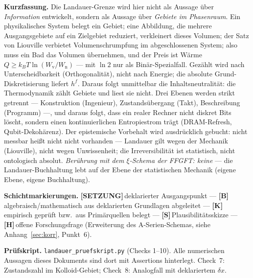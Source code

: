 \documentclass[11pt,a4paper]{article}
\newcommand{\LS}{\textcolor{laySet}{\textbf{\footnotesize\textsf{[SETZUNG]}}}\,}
\newcommand{\LK}{\textcolor{layK}{\textbf{\footnotesize\textsf{[K]}}}\,}
\newcommand{\LB}{\textcolor{layB}{\textbf{\footnotesize\textsf{[B]}}}\,}
\newcommand{\LSk}{\textcolor{layS}{\textbf{\footnotesize\textsf{[S]}}}\,}
\newcommand{\LH}{\textcolor{layH}{\textbf{\footnotesize\textsf{[H]}}}\,}
\begin{document}
\begingroup\small\noindent
\textbf{Kurzfassung.} Die Landauer-Grenze wird hier nicht als Aussage über
\emph{Information} entwickelt, sondern als Aussage über \emph{Gebiete im
Phasenraum}. Ein physikalisches System belegt ein Gebiet; eine Abbildung, die
mehrere Ausgangsgebiete auf ein Zielgebiet reduziert, verkleinert dieses
Volumen; der Satz von Liouville verbietet Volumenschrumpfung im abgeschlossenen
System; also muss ein Bad das Volumen übernehmen, und der Preis ist Wärme
$Q \ge k_B T \ln(W_{\text{v}}/W_{\text{n}})$ --- mit $\ln 2$ nur als
Binär-Spezialfall. Gezählt wird nach Unterscheidbarkeit (Orthogonalität), nicht
nach Energie; die absolute Grund-Diskretisierung liefert $h^f$. Daraus folgt
unmittelbar die Inhaltsneutralität: die Thermodynamik zählt Gebiete und liest
sie nicht. Drei Ebenen werden strikt getrennt --- Konstruktion (Ingenieur),
Zustandsübergang (Takt), Beschreibung (Programm) ---, und daraus folgt, dass ein
realer Rechner nicht diskret Bits löscht, sondern einen kontinuierlichen
Entropiestrom trägt (DRAM-Refresh, Qubit-Dekohärenz). Der epistemische Vorbehalt
wird ausdrücklich gebucht: nicht messbar heißt nicht nicht vorhanden --- Landauer
gilt wegen der Mechanik (Liouville), nicht wegen Unwissenheit; die
Irreversibilität ist statistisch, nicht ontologisch absolut. \emph{Berührung mit
dem $\xi$-Schema der FFGFT: keine} --- die Landauer-Buchhaltung lebt auf der
Ebene der statistischen Mechanik (eigene Ebene, eigene Buchhaltung).
\par\endgroup

\bigskip

\begingroup\small\noindent
\textbf{Schichtmarkierungen.} \LS deklarierter Ausgangspunkt ---
\LB algebraisch/mathematisch aus deklarierten Grundlagen abgeleitet ---
\LK empirisch geprüft bzw.\ aus Primärquellen belegt ---
\LSk Plausibilitätsskizze ---
\LH offene Forschungsfrage (Erweiterung des A-Serien-Schemas, siehe
Anhang~\ref{sec:korr}, Punkt~6).
\par\endgroup

\bigskip

\begingroup\small\noindent
\textbf{Prüfskript.} \texttt{landauer\_pruefskript.py} (Checks 1--10). Alle
numerischen Aussagen dieses Dokuments sind dort mit Assertions hinterlegt.
Check~7: Zustandszahl im Kolloid-Gebiet; Check~8: Analogfall mit deklariertem
$\delta x$.
\par\endgroup

\bigskip

\end{document}
